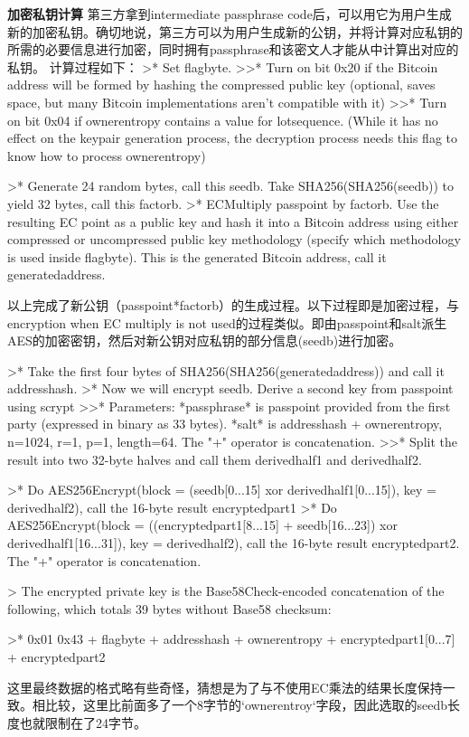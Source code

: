 \documentclass{article}
\begin{document}
\textbf{加密私钥计算}
第三方拿到intermediate passphrase code后，可以用它为用户生成新的加密私钥。确切地说，第三方可以为用户生成新的公钥，并将计算对应私钥的所需的必要信息进行加密，同时拥有passphrase和该密文人才能从中计算出对应的私钥。  
计算过程如下：
>* Set flagbyte.      
>>* Turn on bit 0x20 if the Bitcoin address will be formed by hashing the compressed public key (optional, saves space, but many Bitcoin implementations aren't compatible with it)
>>* Turn on bit 0x04 if ownerentropy contains a value for lotsequence. (While it has no effect on the keypair generation process, the decryption process needs this flag to know how to process ownerentropy)  

>* Generate 24 random bytes, call this seedb. Take SHA256(SHA256(seedb)) to yield 32 bytes, call this factorb.
>* ECMultiply passpoint by factorb. Use the resulting EC point as a public key and hash it into a Bitcoin address using either compressed or uncompressed public key methodology (specify which methodology is used inside flagbyte). This is the generated Bitcoin address, call it generatedaddress.

以上完成了新公钥（passpoint*factorb）的生成过程。以下过程即是加密过程，与encryption when EC multiply is not used的过程类似。即由passpoint和salt派生AES的加密密钥，然后对新公钥对应私钥的部分信息(seedb)进行加密。

>* Take the first four bytes of SHA256(SHA256(generatedaddress)) and call it addresshash.
>* Now we will encrypt seedb. Derive a second key from passpoint using scrypt  
>>* Parameters: *passphrase* is passpoint provided from the first party (expressed in binary as 33 bytes). *salt* is addresshash + ownerentropy, n=1024, r=1, p=1, length=64. The "+" operator is concatenation.
>>* Split the result into two 32-byte halves and call them derivedhalf1 and derivedhalf2.


>* Do AES256Encrypt(block = (seedb[0...15] xor derivedhalf1[0...15]), key = derivedhalf2), call the 16-byte result encryptedpart1
>* Do AES256Encrypt(block = ((encryptedpart1[8...15] + seedb[16...23]) xor derivedhalf1[16...31]), key = derivedhalf2), call the 16-byte result encryptedpart2. The "+" operator is concatenation.

> The encrypted private key is the Base58Check-encoded concatenation of the following, which totals 39 bytes without Base58 checksum:    

>* 0x01 0x43 + flagbyte + addresshash + ownerentropy +  encryptedpart1[0...7] + encryptedpart2

这里最终数据的格式略有些奇怪，猜想是为了与不使用EC乘法的结果长度保持一致。相比较，这里比前面多了一个8字节的`ownerentroy`字段，因此选取的seedb长度也就限制在了24字节。
\end{document}

